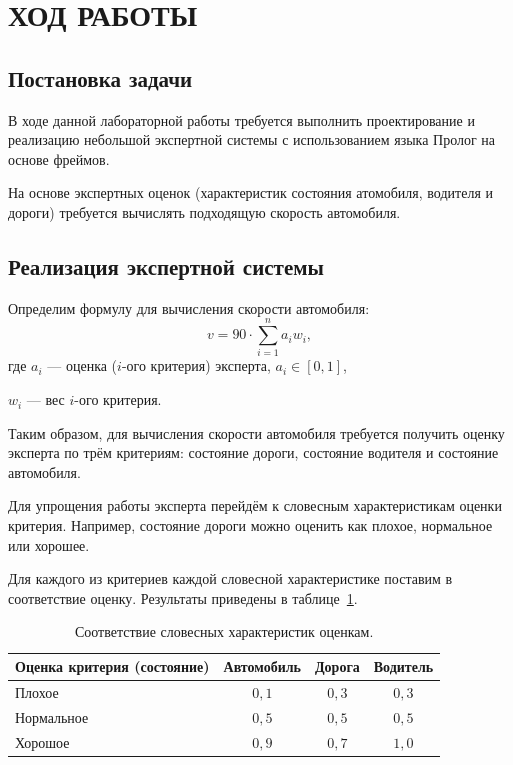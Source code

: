 \section{ХОД РАБОТЫ}

\subsection{Постановка задачи}

В ходе данной лабораторной работы требуется выполнить проектирование
и реализацию небольшой экспертной системы с использованием языка Пролог
на основе фреймов.

На основе экспертных оценок (характеристик состояния атомобиля,
водителя и дороги) требуется вычислять подходящую скорость автомобиля.


\subsection{Реализация экспертной системы}

Определим формулу для вычисления скорости автомобиля:
\begin{equation*}
  v = 90 \cdot \sum_{i = 1}^n a_i w_i,
\end{equation*}
где \hspace{2mm} $a_i$ --- оценка ($i$-ого критерия) эксперта, $ a_i \in [0,1] $, \par
$w_i$ --- вес $i$-ого критерия.

Таким образом, для вычисления скорости автомобиля требуется получить оценку
эксперта по трём критериям: состояние дороги, состояние водителя и состояние автомобиля. 

Для упрощения работы эксперта перейдём к словесным характеристикам оценки критерия.
Например, состояние дороги можно оценить как плохое, нормальное или хорошее.

Для каждого из критериев каждой словесной характеристике поставим в соответствие
оценку. Результаты приведены в таблице~\ref{tbl:evals}.
\begin{table}[h!]
  \caption{Соответствие словесных характеристик оценкам.}
  \label{tbl:evals}
  \begin{tabular}{| p{85mm} | c | c | c |}
    \hline
    
    Оценка критерия (состояние) &
    Автомобиль &
    Дорога &
    Водитель \\
    \hline
    
    Плохое      & $0{,}1$ & $0{,}3$ & $0{,}3$ \\ \hline
    Нормальное  & $0{,}5$ & $0{,}5$ & $0{,}5$ \\ \hline
    Хорошое     & $0{,}9$ & $0{,}7$ & $1{,}0$ \\
    \hline
  \end{tabular}
\end{table}

